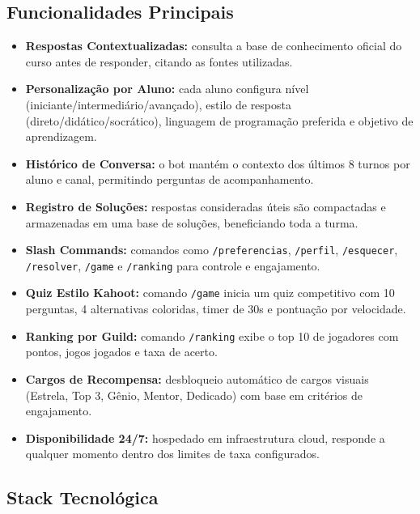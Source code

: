 \documentclass[11pt,a4paper]{article}
\begin{document}
\subsection{Funcionalidades Principais}

\begin{itemize}[leftmargin=1.5em, itemsep=0.3em]
  \item \textbf{Respostas Contextualizadas:} consulta a base de conhecimento oficial do curso antes de responder, citando as fontes utilizadas.
  \item \textbf{Personalização por Aluno:} cada aluno configura nível (iniciante/intermediário/avançado), estilo de resposta (direto/didático/socrático), linguagem de programação preferida e objetivo de aprendizagem.
  \item \textbf{Histórico de Conversa:} o bot mantém o contexto dos últimos 8 turnos por aluno e canal, permitindo perguntas de acompanhamento.
  \item \textbf{Registro de Soluções:} respostas consideradas úteis são compactadas e armazenadas em uma base de soluções, beneficiando toda a turma.
  \item \textbf{Slash Commands:} comandos como \texttt{/preferencias}, \texttt{/perfil}, \texttt{/esquecer}, \texttt{/resolver}, \texttt{/game} e \texttt{/ranking} para controle e engajamento.
  \item \textbf{Quiz Estilo Kahoot:} comando \texttt{/game} inicia um quiz competitivo com 10 perguntas, 4 alternativas coloridas, timer de 30s e pontuação por velocidade.
  \item \textbf{Ranking por Guild:} comando \texttt{/ranking} exibe o top 10 de jogadores com pontos, jogos jogados e taxa de acerto.
  \item \textbf{Cargos de Recompensa:} desbloqueio automático de cargos visuais (Estrela, Top 3, Gênio, Mentor, Dedicado) com base em critérios de engajamento.
  \item \textbf{Disponibilidade 24/7:} hospedado em infraestrutura cloud, responde a qualquer momento dentro dos limites de taxa configurados.
\end{itemize}

\subsection{Stack Tecnológica}
\end{document}
